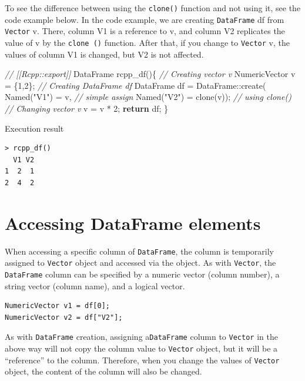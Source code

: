 \documentclass[]{book}
\newenvironment{Shaded}{\begin{snugshade}}{\end{snugshade}}
\newcommand{\DecValTok}[1]{\textcolor[rgb]{0.00,0.00,0.81}{#1}}
\newcommand{\StringTok}[1]{\textcolor[rgb]{0.31,0.60,0.02}{#1}}
\newcommand{\CommentTok}[1]{\textcolor[rgb]{0.56,0.35,0.01}{\textit{#1}}}
\newcommand{\ControlFlowTok}[1]{\textcolor[rgb]{0.13,0.29,0.53}{\textbf{#1}}}
\newcommand{\NormalTok}[1]{#1}
\theoremstyle{definition}
\theoremstyle{definition}
\theoremstyle{remark}
\begin{document}
To see the difference between using the \texttt{clone()} function and
not using it, see the code example below. In the code example, we are
creating \texttt{DataFrame} df from \texttt{Vector} v. There, column V1
is a reference to v, and column V2 replicates the value of v by the
\texttt{clone\ ()} function. After that, if you change to
\texttt{Vector} v, the values of column V1 is changed, but V2 is not
affected.

\begin{Shaded}
\begin{Highlighting}[]
\CommentTok{// [[Rcpp::export]]}
\NormalTok{DataFrame rcpp_df()\{}
    \CommentTok{// Creating vector v}
\NormalTok{    NumericVector v = \{}\DecValTok{1}\NormalTok{,}\DecValTok{2}\NormalTok{\};}
    \CommentTok{// Creating DataFrame df}
\NormalTok{    DataFrame df = DataFrame::create( Named(}\StringTok{"V1"}\NormalTok{) = v,         }\CommentTok{// simple assign}
\NormalTok{                                      Named(}\StringTok{"V2"}\NormalTok{) = clone(v)); }\CommentTok{// using clone()}
    \CommentTok{// Changing vector v}
\NormalTok{    v = v * }\DecValTok{2}\NormalTok{;}
    \ControlFlowTok{return}\NormalTok{ df;}
\NormalTok{\}}
\end{Highlighting}
\end{Shaded}

Execution result

\begin{verbatim}
> rcpp_df()
  V1 V2
1  2  1
2  4  2
\end{verbatim}

\section{Accessing DataFrame
elements}\label{accessing-dataframe-elements}

When accessing a specific column of \texttt{DataFrame}, the column is
temporarily assigned to \texttt{Vector} object and accessed via the
object. As with \texttt{Vector}, the \texttt{DataFrame} column can be
specified by a numeric vector (column number), a string vector (column
name), and a logical vector.

\begin{verbatim}
NumericVector v1 = df[0];
NumericVector v2 = df["V2"];
\end{verbatim}

As with \texttt{DataFrame} creation, assigning a\texttt{DataFrame}
column to \texttt{Vector} in the above way will not copy the column
value to \texttt{Vector} object, but it will be a ``reference'' to the
column. Therefore, when you change the values of \texttt{Vector} object,
the content of the column will also be changed.
\end{document}
